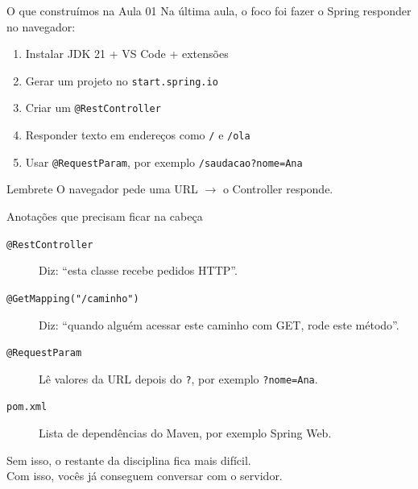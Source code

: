 \documentclass[aspectratio=169,11pt]{beamer}
\begin{document}
\begin{frame}{O que construímos na Aula 01}
  Na última aula, o foco foi fazer o Spring responder no navegador:

  \vspace{0.6em}
  \begin{enumerate}
    \item Instalar JDK 21 + VS Code + extensões
    \item Gerar um projeto no \texttt{start.spring.io}
    \item Criar um \texttt{@RestController}
    \item Responder texto em endereços como \texttt{/} e \texttt{/ola}
    \item Usar \texttt{@RequestParam}, por exemplo \texttt{/saudacao?nome=Ana}
  \end{enumerate}

  \vspace{0.6em}
  \begin{alertblock}{Lembrete}
    O navegador pede uma URL $\rightarrow$ o Controller responde.
  \end{alertblock}
\end{frame}

\begin{frame}{Anotações que precisam ficar na cabeça}
  \begin{description}
    \item[\texttt{@RestController}] Diz: ``esta classe recebe pedidos HTTP''.
    \item[\texttt{@GetMapping("/caminho")}] Diz: ``quando alguém acessar
      este caminho com GET, rode este método''.
    \item[\texttt{@RequestParam}] Lê valores da URL depois do \texttt{?},
      por exemplo \texttt{?nome=Ana}.
    \item[\texttt{pom.xml}] Lista de dependências do Maven,
      por exemplo Spring Web.
  \end{description}

  \vspace{0.6em}
  Sem isso, o restante da disciplina fica mais difícil.\\
  Com isso, vocês já conseguem conversar com o servidor.
\end{frame}
\end{document}
